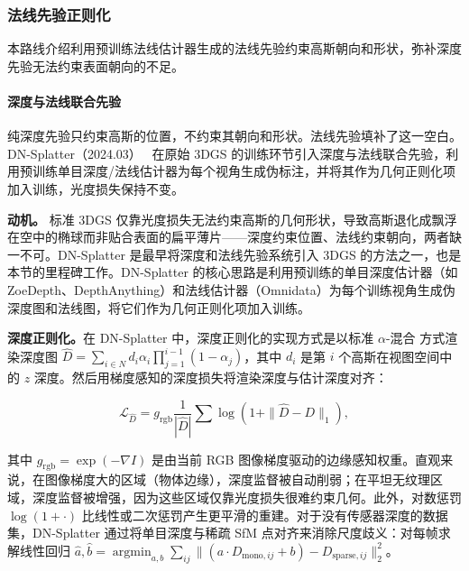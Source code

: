 \subsubsection{法线先验正则化}
\label{subsec:04_1_3}

本路线介绍利用预训练法线估计器生成的法线先验约束高斯朝向和形状，弥补深度先验无法约束表面朝向的不足。

\paragraph{深度与法线联合先验}

纯深度先验只约束高斯的位置，不约束其朝向和形状。法线先验填补了这一空白。DN-Splatter（2024.03）~\cite{2403_17822} 在原始 3DGS 的训练环节引入深度与法线联合先验，利用预训练单目深度/法线估计器为每个视角生成伪标注，并将其作为几何正则化项加入训练，光度损失保持不变。

\textbf{动机。} 标准 3DGS 仅靠光度损失无法约束高斯的几何形状，导致高斯退化成飘浮在空中的椭球而非贴合表面的扁平薄片——深度约束位置、法线约束朝向，两者缺一不可。DN-Splatter 是最早将深度和法线先验系统引入 3DGS 的方法之一，也是本节的里程碑工作。DN-Splatter 的核心思路是利用预训练的单目深度估计器（如 ZoeDepth、DepthAnything）和法线估计器（Omnidata）为每个训练视角生成伪深度图和法线图，将它们作为几何正则化项加入训练。

\textbf{深度正则化。}在 DN-Splatter 中，深度正则化的实现方式是以标准 $\alpha$-混合 方式渲染深度图 $\hat{D} = \sum_{i \in N} d_i \alpha_i \prod_{j=1}^{i-1}(1-\alpha_j)$，其中 $d_i$ 是第 $i$ 个高斯在视图空间中的 $z$ 深度。然后用梯度感知的深度损失将渲染深度与估计深度对齐：

\begin{equation}
\mathcal{L}_{\hat{D}} = g_{\text{rgb}} \frac{1}{|\hat{D}|} \sum \log(1 + \|\hat{D} - D\|_1),
\end{equation}

其中 $g_{\text{rgb}} = \exp(-\nabla I)$ 是由当前 RGB 图像梯度驱动的边缘感知权重。直观来说，在图像梯度大的区域（物体边缘），深度监督被自动削弱；在平坦无纹理区域，深度监督被增强，因为这些区域仅靠光度损失很难约束几何。此外，对数惩罚 $\log(1+\cdot)$ 比线性或二次惩罚产生更平滑的重建。对于没有传感器深度的数据集，DN-Splatter 通过将单目深度与稀疏 SfM 点对齐来消除尺度歧义：对每帧求解线性回归 $\hat{a}, \hat{b} = \operatorname{argmin}_{a,b} \sum_{ij} \|(a \cdot D_{\text{mono},ij} + b) - D_{\text{sparse},ij}\|_2^2$。

